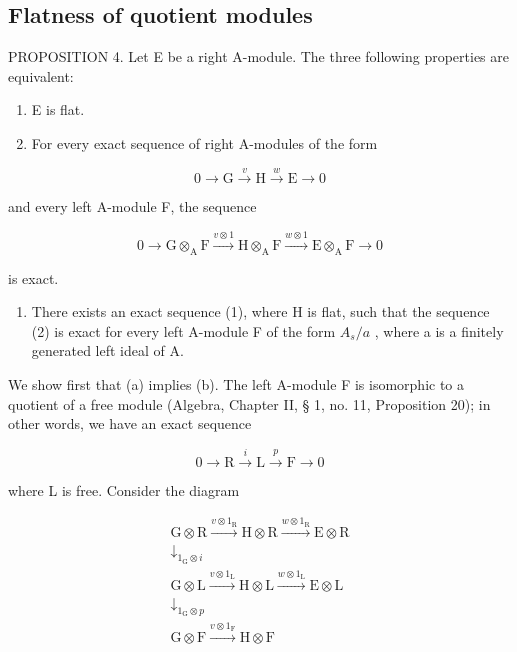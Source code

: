 \subsection{Flatness of quotient modules}

PROPOSITION 4. Let E be a right A-module. The three following properties are equivalent:

\begin{enumerate}
\def\labelenumi{(\alph{enumi})}
\item
  E is flat.
\item
  For every exact sequence of right A-modules of the form
\end{enumerate}

\[
0 \longrightarrow \mathrm{G} \stackrel {v} {\longrightarrow} \mathrm{H} \stackrel {w} {\longrightarrow} \mathrm{E} \longrightarrow 0\tag{1}
\]

and every left A-module F, the sequence

\[
0 \longrightarrow \mathrm{G} \otimes_ {\mathrm{A}} \mathrm{F} \xrightarrow {v \otimes 1} \mathrm{H} \otimes_ {\mathrm{A}} \mathrm{F} \xrightarrow {w \otimes 1} \mathrm{E} \otimes_ {\mathrm{A}} \mathrm{F} \longrightarrow 0\tag{2}
\]

is exact.

\begin{enumerate}
\def\labelenumi{(\alph{enumi})}
\setcounter{enumi}{2}
\tightlist
\item
  There exists an exact sequence (1), where H is flat, such that the sequence (2) is exact for every left A-module F of the form \(A_{s}/a\) , where a is a finitely generated left ideal of A.
\end{enumerate}

We show first that (a) implies (b). The left A-module F is isomorphic to a quotient of a free module (Algebra, Chapter II, § 1, no. 11, Proposition 20); in other words, we have an exact sequence

\[
0 \longrightarrow \mathrm{R} \stackrel {i} {\longrightarrow} \mathrm{L} \stackrel {p} {\longrightarrow} \mathrm{F} \longrightarrow 0
\]

where L is free. Consider the diagram

\[
\begin{array}{c} \mathrm{G} \otimes \mathrm{R} \xrightarrow {v \otimes 1 _ {\mathrm{R}}} \mathrm{H} \otimes \mathrm{R} \xrightarrow {w \otimes 1 _ {\mathrm{R}}} \mathrm{E} \otimes \mathrm{R} \\ \downarrow_ {1 _ {\mathrm{G}} \otimes i} \\ \mathrm{G} \otimes \mathrm{L} \xrightarrow {v \otimes 1 _ {\mathrm{L}}} \mathrm{H} \otimes \mathrm{L} \xrightarrow {w \otimes 1 _ {\mathrm{L}}} \mathrm{E} \otimes \mathrm{L} \\ \downarrow_ {1 _ {\mathrm{G}} \otimes p} \\ \mathrm{G} \otimes \mathrm{F} \xrightarrow {v \otimes 1 _ {\mathrm{F}}} \mathrm{H} \otimes \mathrm{F} \end{array}\tag{3}
\]

